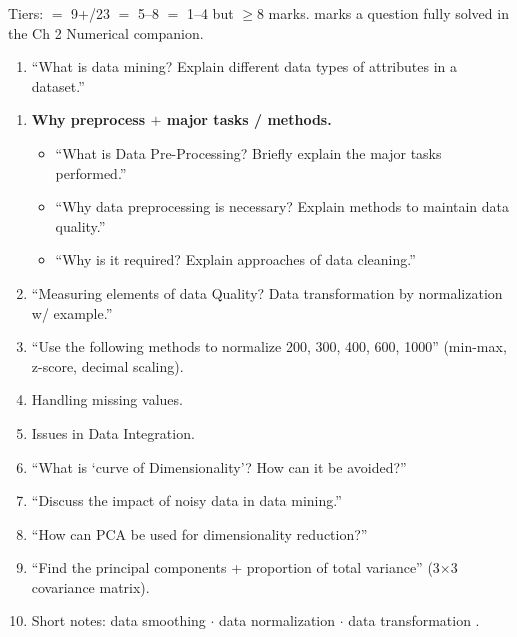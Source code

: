 \hr


{\color{sub}\footnotesize Tiers: \tS{} $=$ 9+/23 \gap \tF{} $=$ 5--8 \gap \tP{} $=$ 1--4 but $\ge$8 marks.
 marks a question fully solved in the Ch 2 Numerical companion.}

\begin{enumerate}
  \item {} ``What is data mining? Explain different data types of attributes in a dataset.'' \hfill {} 
\end{enumerate}

\begin{enumerate}[start=2]
  \item {} \textbf{Why preprocess $+$ major tasks / methods.}
  \begin{itemize}
    \item ``What is Data Pre-Processing? Briefly explain the major tasks performed.'' \hfill {} 
    \item ``Why data preprocessing is necessary? Explain methods to maintain data quality.'' \hfill {} 
    \item ``Why is it required? Explain approaches of data cleaning.'' \hfill {} 
  \end{itemize}
  \item {} ``Measuring elements of data Quality? Data transformation by normalization w/ example.'' \hfill {} 
  \item {} ``Use the following methods to normalize 200, 300, 400, 600, 1000'' (min-max, z-score, decimal scaling). \hfill {} 
  \item {} Handling missing values. \hfill {}   
  \item {} Issues in Data Integration. \hfill {} 
  \item {} ``What is `curve of Dimensionality'? How can it be avoided?'' \hfill {} 
        {\footnotesize{}}
  \item {} ``Discuss the impact of noisy data in data mining.'' \hfill {} 
  \item {} ``How can PCA be used for dimensionality reduction?'' \hfill {} 
  \item {} ``Find the principal components + proportion of total variance'' (3$\times$3 covariance matrix). \hfill {} 
  \item {} Short notes: data smoothing  $\cdot$ data normalization  $\cdot$
        data transformation . \hfill {}
\end{enumerate}

